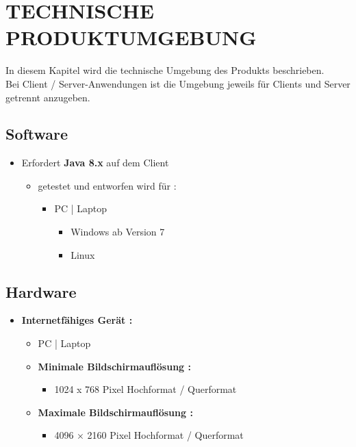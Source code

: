 	
	\section{\Large TECHNISCHE PRODUKTUMGEBUNG}
   	In diesem Kapitel wird die technische Umgebung des Produkts beschrieben.\\
   	Bei Client / Server-Anwendungen ist die Umgebung jeweils für Clients und Server getrennt anzugeben.
	\subsection{Software}
	\begin{itemize}
		\item Erfordert \textbf{Java 8.x} auf dem Client
		\begin{itemize}
			\item getestet und entworfen wird für :
			\begin{itemize}
				\item PC | Laptop
				\begin{itemize}
					\item Windows ab Version 7
					\item Linux
				\end{itemize}
			\end{itemize}
		\end{itemize}
	\end{itemize}
	\subsection{Hardware}
	\begin{itemize}
		\item \textbf{Internetfähiges Gerät :}
		\begin{itemize}
			\item PC | Laptop
			\item \textbf{Minimale Bildschirmauflösung :}
				\begin{itemize}
					\item 1024 x 768 Pixel Hochformat / Querformat
				\end{itemize}
					\item \textbf{Maximale Bildschirmauflösung :}
				\begin{itemize}
				\item 4096 × 2160 Pixel Hochformat / Querformat
				\end{itemize}		
		\end{itemize}
	\end{itemize}
